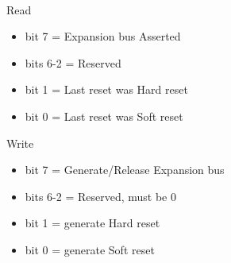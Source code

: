 \\
Read
\begin{itemize}
\item bit 7 = Expansion bus  Asserted
\item bits 6-2 = Reserved
\item bit 1 = Last reset was Hard reset
\item bit 0 = Last reset was Soft reset
\end{itemize}
Write
\begin{itemize}
\item bit 7 = Generate/Release Expansion bus 
\item bits 6-2 = Reserved, must be 0
\item bit 1 = generate Hard reset
\item bit 0 = generate Soft reset
\end{itemize}

